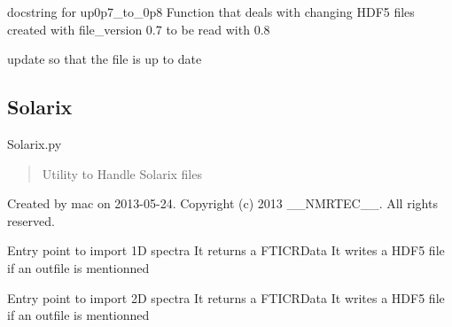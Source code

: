 \documentclass[letterpaper,10pt,openany,oneside]{sphinxmanual}
\begin{document}

\begin{fulllineitems}
\label{rst/code:File.HDF5File.up0p7_to_0p8}
docstring for up0p7\_to\_0p8
Function that deals with changing HDF5 files created with file\_version 0.7 to be read with 0.8

\end{fulllineitems}


\begin{fulllineitems}
\label{rst/code:File.HDF5File.update}
update so that the file is up to date

\end{fulllineitems}



\subsection{Solarix}
\label{rst/code:module-File.Solarix}\label{rst/code:solarix}
Solarix.py
\begin{quote}

Utility to Handle Solarix files
\end{quote}

Created by mac on 2013-05-24.
Copyright (c) 2013 \_\_NMRTEC\_\_. All rights reserved.

\begin{fulllineitems}
\label{rst/code:File.Solarix.Import_1D}
Entry point to import 1D spectra
It returns a FTICRData
It writes a HDF5 file if an outfile is mentionned

\end{fulllineitems}


\begin{fulllineitems}
\label{rst/code:File.Solarix.Import_2D}
Entry point to import 2D spectra
It returns a FTICRData
It writes a HDF5 file if an outfile is mentionned

\end{fulllineitems}
\end{document}
